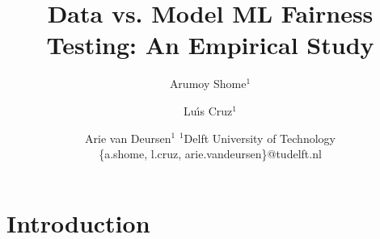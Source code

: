 \documentclass{article}
\title{Data vs. Model ML Fairness Testing: An Empirical Study}
\author{
  Arumoy Shome$^1$
  \and
  Lu{\'\i}s Cruz$^1$\and
  Arie van Deursen$^{1}$
  \affiliations
  $^1$Delft University of Technology\\
  \emails
  \{a.shome, l.cruz, arie.vandeursen\}@tudelft.nl
}
\begin{document}
\maketitle

\begin{abstract}
\end{abstract}

\section{Introduction}\label{sec:intro}






\end{document}
